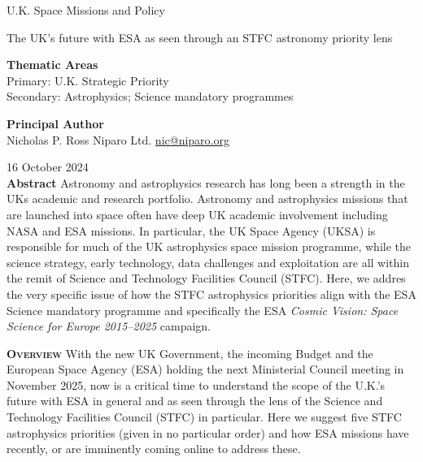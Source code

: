 \documentclass[a4paper,12pt]{article}
\begin{document}
\raggedright
\huge
U.K. Space Missions and Policy \linebreak
\vspace{48pt}


\textcolor{Cerulean}{
The UK’s future with ESA as seen through an STFC astronomy priority lens}  
\normalsize
\linebreak \linebreak 
\vspace{48pt}


\noindent \textbf{Thematic Areas} \\
Primary: U.K. Strategic Priority \\
Secondary: Astrophysics; Science mandatory programmes 
\linebreak
\vspace{24pt}
  
\textbf{Principal Author} \\
Nicholas P. Ross	
 \linebreak						
Niparo Ltd. 
 \linebreak
\href{mailto:nic@niparo.org}{nic@niparo.org}
 \linebreak

\vspace{24pt}
16 October 2024 \\

\vspace{24pt}
\justify
\textbf{Abstract}
Astronomy and astrophysics research has long been a strength in the
UKs academic and research portfolio.  Astronomy and astrophysics
missions that are launched into space often have deep UK academic
involvement including NASA and ESA missions.  In particular, the UK
Space Agency (UKSA) is responsible for much of the UK astrophysics
space mission programme, while the science strategy, early technology,
data challenges and exploitation are all within the remit of Science
and Technology Facilities Council (STFC).  Here, we addres the very
specific issue of how the STFC astrophysics priorities align with the
ESA Science mandatory programme and specifically the ESA
\textit{Cosmic Vision: Space Science for Europe 2015–2025} campaign.



\pagebreak
\smallskip
\smallskip
\noindent
\vspace{-12pt}
{\bfseries \textsc{\textcolor{Cerulean}{Overview}}}
With the new UK Government, the incoming Budget and the European Space
Agency (ESA) holding the next Ministerial Council meeting in November
2025, now is a critical time to understand the scope of the U.K.'s
future with ESA in general and as seen through the lens of the Science
and Technology Facilities Council (STFC) in particular. Here we
suggest five STFC astrophysics priorities (given in no particular
order) and how ESA missions have recently, or are imminently coming
online to address these.
\end{document}
